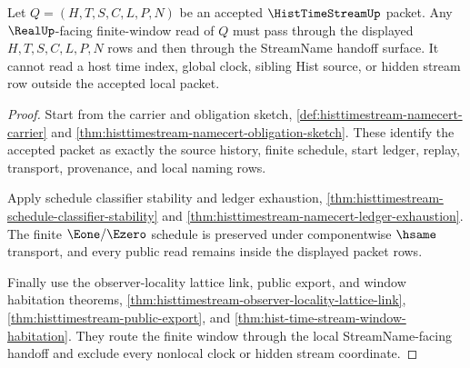 \begin{theorem}
\label{thm:histtimestream-real-streamname-window-lock}
Let $Q=(H,T,S,C,L,P,N)$ be an accepted $\HistTimeStreamUp$ packet. Any $\RealUp$-facing finite-window read of $Q$ must pass through the displayed $H,T,S,C,L,P,N$ rows and then through the StreamName handoff surface. It cannot read a host time index, global clock, sibling Hist source, or hidden stream row outside the accepted local packet.
\end{theorem}
\begin{proof}
Start from the carrier and obligation sketch, \autoref{def:histtimestream-namecert-carrier} and \autoref{thm:histtimestream-namecert-obligation-sketch}. These identify the accepted packet as exactly the source history, finite schedule, start ledger, replay, transport, provenance, and local naming rows.

Apply schedule classifier stability and ledger exhaustion, \autoref{thm:histtimestream-schedule-classifier-stability} and \autoref{thm:histtimestream-namecert-ledger-exhaustion}. The finite $\Eone/\Ezero$ schedule is preserved under componentwise $\hsame$ transport, and every public read remains inside the displayed packet rows.

Finally use the observer-locality lattice link, public export, and window habitation theorems, \autoref{thm:histtimestream-observer-locality-lattice-link}, \autoref{thm:histtimestream-public-export}, and \autoref{thm:hist-time-stream-window-habitation}. They route the finite window through the local StreamName-facing handoff and exclude every nonlocal clock or hidden stream coordinate.
\end{proof}

